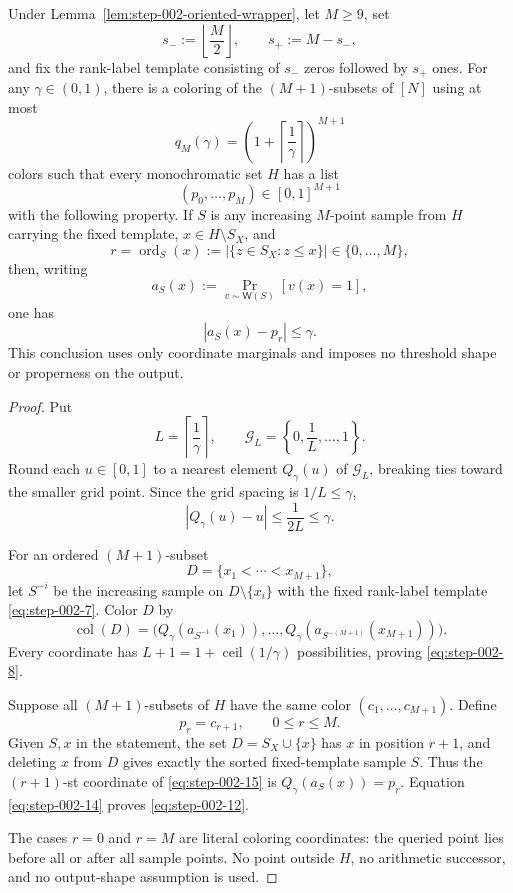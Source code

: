 \begin{proposition}
\label{prop:step-002-finite-homogeneity}

Under Lemma~\ref{lem:step-002-oriented-wrapper}, let \(M\ge 9\), set
\[
s_-:=\left\lfloor\frac M2\right\rfloor,
\qquad
s_+:=M-s_-,
\tag{7}\label{eq:step-002-7}
\]
and fix the rank-label template consisting of \(s_-\) zeros followed by \(s_+\) ones. For any \(\gamma \in (0,1)\), there is a coloring of the \((M+1)\)-subsets of \([N]\) using at most
\[
q_M(\gamma)
=\left(1+\left\lceil\frac1\gamma\right\rceil\right)^{M+1}
\tag{8}\label{eq:step-002-8}
\]
colors such that every monochromatic set \(H\) has a list
\[
(p_0,\ldots,p_M)\in[0,1]^{M+1}
\tag{9}\label{eq:step-002-9}
\]
with the following property. If \(S\) is any increasing \(M\)-point sample from \(H\) carrying the fixed template, \(x \in H\setminus S_X\), and
\[
r=\operatorname{ord}_S(x)
:=|\{z\in S_X:z\le x\}|\in\{0,\ldots,M\},
\tag{10}\label{eq:step-002-10}
\]
then, writing
\[
a_S(x):=\Pr_{v\sim\mathsf W(S)}[v(x)=1],
\tag{11}\label{eq:step-002-11}
\]
one has
\[
|a_S(x)-p_r|\le\gamma.
\tag{12}\label{eq:step-002-12}
\]
This conclusion uses only coordinate marginals and imposes no threshold shape or properness on the output.

\end{proposition}

\begin{proof}

Put
\[
L=\left\lceil\frac1\gamma\right\rceil,
\qquad
\mathcal G_L=\left\{0,\frac1L,\ldots,1\right\}.
\tag{13}\label{eq:step-002-13}
\]
Round each \(u \in [0,1]\) to a nearest element \(Q_\gamma(u)\) of \(\mathcal G_L\), breaking ties toward the smaller grid point. Since the grid spacing is \(1/L\le \gamma\),
\[
|Q_\gamma(u)-u|\le\frac1{2L}\le\gamma.
\tag{14}\label{eq:step-002-14}
\]

For an ordered \((M+1)\)-subset
\[
D=\{x_1<\cdots<x_{M+1}\},
\]
let \(S^{-i}\) be the increasing sample on \(D\setminus\{x_i\}\) with the fixed rank-label template \eqref{eq:step-002-7}. Color \(D\) by
\[
\operatorname{col}(D)
=\bigl(Q_\gamma(a_{S^{-1}}(x_1)),\ldots,
Q_\gamma(a_{S^{-(M+1)}}(x_{M+1}))\bigr).
\tag{15}\label{eq:step-002-15}
\]
Every coordinate has \(L+1=1+\operatorname{ceil}(1/\gamma)\) possibilities, proving \eqref{eq:step-002-8}.

Suppose all \((M+1)\)-subsets of \(H\) have the same color
\((c_1,\ldots,c_{M+1})\). Define
\[
p_r=c_{r+1},
\qquad 0\le r\le M.
\tag{16}\label{eq:step-002-16}
\]
Given \(S,x\) in the statement, the set \(D=S_X \cup\{x\}\) has \(x\) in position \(r+1\), and deleting \(x\) from \(D\) gives exactly the sorted fixed-template sample \(S\). Thus the \((r+1)\)-st coordinate of \eqref{eq:step-002-15} is \(Q_\gamma(a_S(x))=p_r\). Equation \eqref{eq:step-002-14} proves \eqref{eq:step-002-12}.

The cases \(r=0\) and \(r=M\) are literal coloring coordinates: the queried point lies before all or after all sample points. No point outside \(H\), no arithmetic successor, and no output-shape assumption is used.

\end{proof}


